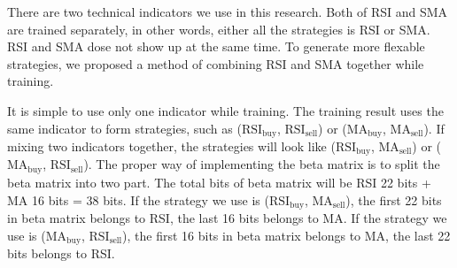 \documentclass[../Proposed Method.tex]{subfiles}
\begin{document}
There are two technical indicators we use in this research. Both of RSI and SMA are trained separately, in other words, either all the strategies is RSI or SMA. RSI and SMA dose not show up at the same time. To generate more flexable strategies, we proposed a method of combining RSI and SMA together while training.

\bigbreak

It is simple to use only one indicator while training. The training result uses the same indicator to form strategies, such as ($\text{RSI}_\text{buy}$, $\text{RSI}_\text{sell}$) or ($\text{MA}_\text{buy}$, $\text{MA}_\text{sell}$). If mixing two indicators together, the strategies will look like ($\text{RSI}_\text{buy}$, $\text{MA}_\text{sell}$) or ($\text{MA}_\text{buy}$, $\text{RSI}_\text{sell}$).
The proper way of implementing the beta matrix is to split the beta matrix into two part. The total bits of beta matrix will be RSI 22 bits + MA 16 bits = 38 bits. If the strategy we use is ($\text{RSI}_\text{buy}$, $\text{MA}_\text{sell}$), the first 22 bits in beta matrix belongs to RSI, the last 16 bits belongs to MA. If the strategy we use is ($\text{MA}_\text{buy}$, $\text{RSI}_\text{sell}$), the first 16 bits in beta matrix belongs to MA, the last 22 bits belongs to RSI.
\end{document}

